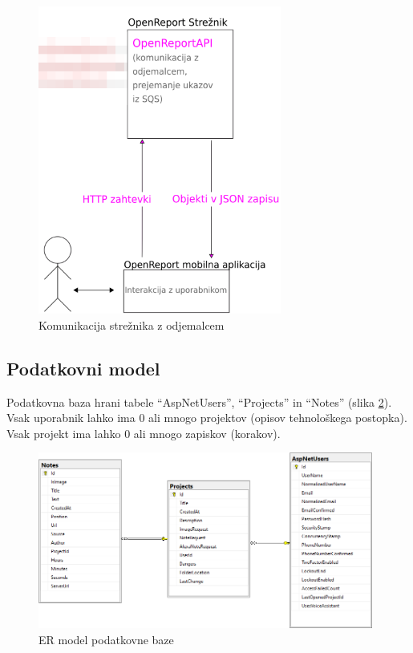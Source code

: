 \documentclass[a4paper, 12pt]{book}
\begin{document}
\begin{figure}[H]
\begin{center}
\includegraphics[width=8cm]{plan_server_client}
\end{center}
\caption{Komunikacija strežnika z odjemalcem}
\label{plan_server_client}
\end{figure}


\subsection{Podatkovni model}

Podatkovna baza hrani tabele \enquote{AspNetUsers}, \enquote{Projects} in \enquote{Notes} (slika \ref{er_diagram}).
Vsak uporabnik lahko ima 0 ali mnogo projektov (opisov tehnološkega postopka).
Vsak projekt ima lahko 0 ali mnogo zapiskov (korakov).

\begin{figure}[H]
\begin{center}
\includegraphics[width=11cm]{er_diagram_small}
\end{center}
\caption{ER model podatkovne baze}
\label{er_diagram}
\end{figure}
\end{document}
